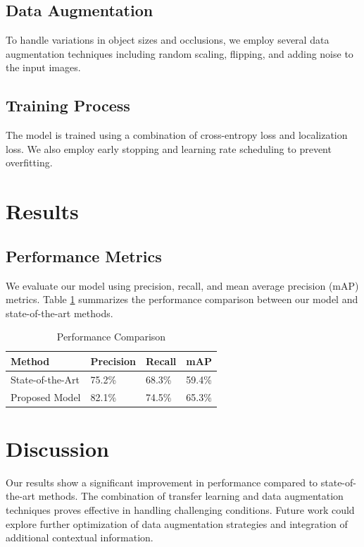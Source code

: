 \documentclass{article}
\begin{document}
\subsection{Data Augmentation}
To handle variations in object sizes and occlusions, we employ several data augmentation techniques including random scaling, flipping, and adding noise to the input images.

\subsection{Training Process}
The model is trained using a combination of cross-entropy loss and localization loss. We also employ early stopping and learning rate scheduling to prevent overfitting.

\section{Results}
\subsection{Performance Metrics}
We evaluate our model using precision, recall, and mean average precision (mAP) metrics. Table \ref{tab:results} summarizes the performance comparison between our model and state-of-the-art methods.

\begin{table}[ht]
\centering
\caption{Performance Comparison}
\label{tab:results}
\begin{tabular}{@{}llll@{}}
\toprule
Method & Precision & Recall & mAP \\ \midrule
State-of-the-Art & 75.2\% & 68.3\% & 59.4\% \\
Proposed Model & 82.1\% & 74.5\% & 65.3\% \\ \bottomrule
\end{tabular}
\end{table}

\section{Discussion}
Our results show a significant improvement in performance compared to state-of-the-art methods. The combination of transfer learning and data augmentation techniques proves effective in handling challenging conditions. Future work could explore further optimization of data augmentation strategies and integration of additional contextual information.
\end{document}
